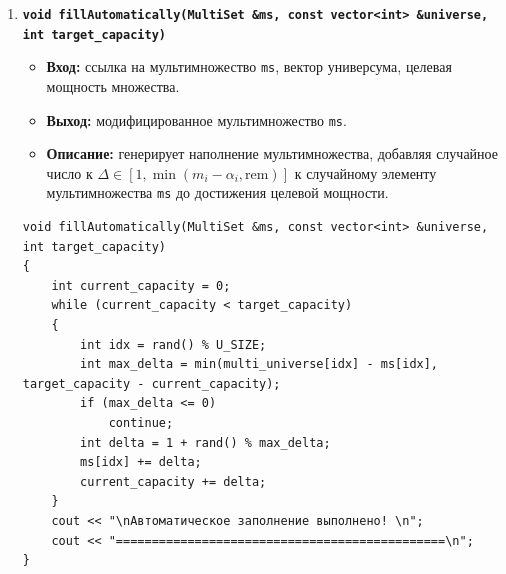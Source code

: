 \documentclass[14pt, a4paper]{extarticle}
\begin{document}
\begin{enumerate}[label=\arabic*., resume]
\begin{lstlisting}[caption={Функция fillManually()}, label={lst:func_fill_manually}]
        int max_allowed = min(remaining_in_u, target_capacity - current_capacity);
        string prompt = format("Введите кратность от 1 до {} (оставшаяся ёмкость в U: {}): ", max_allowed, remaining_in_u);
        int count = getValidatedInt(prompt, 1, max_allowed);

        ms[idx] += count;
        current_capacity += count;
    }

    cout << "==============================================\n";
}
		\end{lstlisting}
		
		\item \textbf{\texttt{void fillAutomatically(MultiSet \&ms, const vector<int> \&universe, int target\_capacity)}}
		\begin{itemize}[leftmargin=*, noitemsep]
			\item \textbf{Вход:} ссылка на мультимножество \texttt{ms}, вектор универсума, целевая мощность множества.
			\item \textbf{Выход:} модифицированное мультимножество \texttt{ms}.
			\item \textbf{Описание:} генерирует наполнение мультимножества, добавляя случайное число к $\Delta \in [1, \min(m_i - \alpha_i, \text{rem})]$ к случайному элементу мультимножества \texttt{ms} до достижения целевой мощности.
		\end{itemize}
		\begin{lstlisting}[caption={Функция fillAutomatically()}, label={lst:func_fill_automatically}]
void fillAutomatically(MultiSet &ms, const vector<int> &universe, int target_capacity)
{
    int current_capacity = 0;
    while (current_capacity < target_capacity)
    {
        int idx = rand() % U_SIZE;
        int max_delta = min(multi_universe[idx] - ms[idx], target_capacity - current_capacity);
        if (max_delta <= 0)
            continue;
        int delta = 1 + rand() % max_delta;
        ms[idx] += delta;
        current_capacity += delta;
    }
    cout << "\nАвтоматическое заполнение выполнено! \n";
    cout << "==============================================\n";
}
		\end{lstlisting}
		

\end{enumerate}
\end{document}
